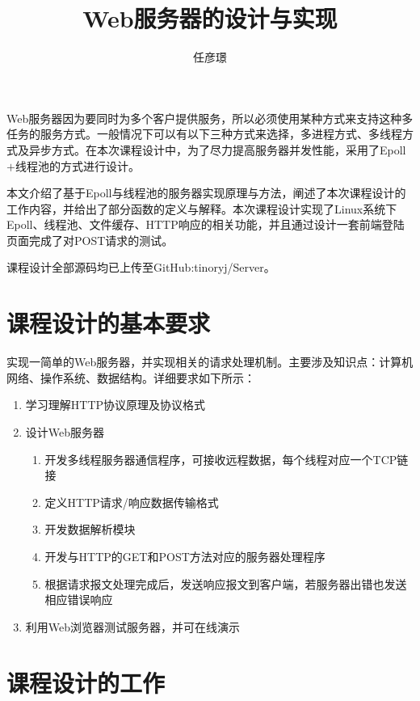 \documentclass[bachelor]{thesis-uestc}
\title{Web服务器的设计与实现}
\author{任彦璟}
\begin{document}
\begin{chineseabstract}

Web服务器因为要同时为多个客户提供服务，所以必须使用某种方式来支持这种多任务的服务方式。一般情况下可以有以下三种方式来选择，多进程方式、多线程方式及异步方式。在本次课程设计中，为了尽力提高服务器并发性能，采用了Epoll$+$线程池的方式进行设计。

本文介绍了基于Epoll与线程池的服务器实现原理与方法，阐述了本次课程设计的工作内容，并给出了部分函数的定义与解释。本次课程设计实现了Linux系统下Epoll、线程池、文件缓存、HTTP响应的相关功能，并且通过设计一套前端登陆页面完成了对POST请求的测试。

课程设计全部源码均已上传至GitHub:tinoryj/Server。


\end{chineseabstract}

\thesistableofcontents

\thesischapterexordium

\section{课程设计的基本要求}

实现一简单的Web服务器，并实现相关的请求处理机制。主要涉及知识点：计算机网络、操作系统、数据结构。详细要求如下所示：

\begin{enumerate}
	\item 学习理解HTTP协议原理及协议格式
	\item 设计Web服务器
	\begin{enumerate}
		\item 开发多线程服务器通信程序，可接收远程数据，每个线程对应一个TCP链接
		\item 定义HTTP请求/响应数据传输格式
		\item 开发数据解析模块
		\item 开发与HTTP的GET和POST方法对应的服务器处理程序
		\item 根据请求报文处理完成后，发送响应报文到客户端，若服务器出错也发送相应错误响应
	\end{enumerate}
	\item 利用Web浏览器测试服务器，并可在线演示

\end{enumerate}

\section{课程设计的工作}
\end{document}

